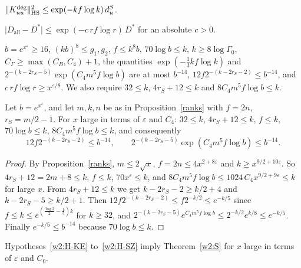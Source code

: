 \begin{hypothesis}\label{w2:H-DG}
$\lVert K^{\deg}_{uu}\rVert_{\mathrm{HS}}^2\le\exp(-kf\log k)\,d^S_u$.
\end{hypothesis}

\begin{hypothesis}\label{w2:H-DIM}
$\lvert D_{\mathrm{all}}-D^*\rvert\le\exp(-c\,rf\log r)\,D^*$ for an absolute $c>0$.
\end{hypothesis}

\begin{hypothesis}[S-SZ, sizes]\label{w2:H-SZ}
$b=e^{x^\varepsilon}\ge16$, $(kb)^8\le g_1,g_2$, $f\le k^8b$, $70\log b\le k$, $k\ge8\log\Gamma_0$, $C_\Gamma\ge\max(C_B,C_4)+1$, the quantities $\exp(-\tfrac13kf\log k)$ and $2^{-(k-2r_S-5)}\exp(C_4m^5f\log b)$ are at most $b^{-14}$, $12f2^{-(k-2r_S-2)}\le b^{-14}$, and $c\,rf\log r\ge x^{\varepsilon/8}$.
We also require $32\le k$, $4r_S+12\le k$ and $8C_4m^5f\log b\le k$.
\end{hypothesis}

\begin{lemma}[sizes]\label{w39:sizes}
Let $b=e^{x^\varepsilon}$, and let $m,k,n$ be as in Proposition~\ref{ranks} with $f=2n$, $r_S=m/2-1$. For $x$ large in terms of $\varepsilon$ and $C_4$: $32\le k$, $4r_S+12\le k$, $f\le k$, $70\log b\le k$, $8C_4m^5f\log b\le k$, and consequently
\[
12f2^{-(k-2r_S-2)}\le b^{-14},\qquad2^{-(k-2r_S-5)}\exp(C_4m^5f\log b)\le b^{-14}.
\]
\end{lemma}

\begin{proof}
By Proposition~\ref{ranks}, $m\le2\sqrt x$, $f=2n\le4x^{2+8\varepsilon}$ and $k\ge x^{9/2+10\varepsilon}$. So $4r_S+12=2m+8\le k$, $f\le k$, $70x^\varepsilon\le k$, and $8C_4m^5f\log b\le1024\,C_4x^{9/2+9\varepsilon}\le k$ for large $x$. From $4r_S+12\le k$ we get $k-2r_S-2\ge k/2+4$ and $k-2r_S-5\ge k/2+1$. Then $12f2^{-(k-2r_S-2)}\le f2^{-k/2}\le e^{-k/5}$ since $f\le k\le e^{(\frac{\log2}2-\frac15)k}$ for $k\ge32$, and $2^{-(k-2r_S-5)}e^{C_4m^5f\log b}\le2^{-k/2}e^{k/8}\le e^{-k/5}$. Finally $e^{-k/5}\le b^{-14}$ because $70\log b\le k$.
\end{proof}

\begin{theorem}\label{w2:Sproof}
Hypotheses~\ref{w2:H-KE} to~\ref{w2:H-SZ} imply Theorem~\ref{w2:S} for $x$ large in terms of $\varepsilon$ and $C_0$.
\end{theorem}

